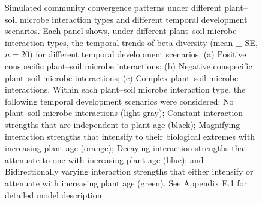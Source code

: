 \newpage
\begin{figure}
	\centering
	\caption[Simulated community convergence patterns under different plant--soil microbe interaction types and different temporal development scenarios.]
		{\hspace{1mm} 
		Simulated community convergence patterns under different plant--soil microbe interaction types and different temporal development scenarios.
		Each panel shows, under different plant--soil microbe interaction types, the temporal trends of beta-diversity (mean $\pm$ SE, $n = 20$) for different temporal development scenarios.
		(a) Positive conspecific plant--soil microbe interactions; (b) Negative conspecific plant--soil microbe interactions; (c) Complex plant--soil microbe interactions.
		Within each plant--soil microbe interaction type, the following temporal development scenarios were considered: 
		No plant--soil microbe interactions (light gray); Constant interaction strengths that are independent to plant age (black); Magnifying interaction strengths that intensify to their biological extremes with increasing plant age (orange); Decaying interaction strengths that attenuate to one with increasing plant age (blue); and Bidirectionally varying interaction strengths that either intensify or attenuate with increasing plant age (green). See Appendix E.1 for detailed model description.}
	\label{fig:SimulationAllPSF}
\end{figure}


